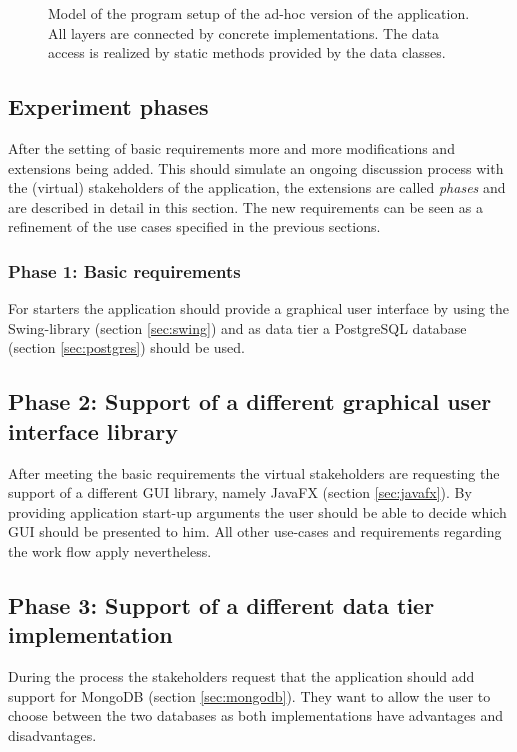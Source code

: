 \begin{figure}
	\label{fig:adhoc-model}
	\caption{Model of the program setup of the ad-hoc version of the application. All layers are connected by concrete implementations. The data access is realized by static methods provided by the data classes.}
\end{figure}

\subsection{Experiment phases}
After the setting of basic requirements more and more modifications and extensions being added. This should simulate an ongoing discussion process with the (virtual) stakeholders of the application, the extensions are called \emph{phases} and are described in detail in this section. The new requirements can be seen as a refinement of the use cases specified in the previous sections.

\subsubsection{Phase 1: Basic requirements} 
For starters the application should provide a graphical user interface by using the Swing-library (section \ref{sec:swing}) and as data tier a PostgreSQL database (section \ref{sec:postgres}) should be used.

\subsection{Phase 2: Support of a different graphical user interface library}
After meeting the basic requirements the virtual stakeholders are requesting the support of a different GUI library, namely JavaFX (section \ref{sec:javafx}). By providing application start-up arguments the user should be able to decide which GUI should be presented to him. All other use-cases and requirements regarding the work flow apply nevertheless.

\subsection{Phase 3: Support of a different data tier implementation}
During the process the stakeholders request that the application should add support for MongoDB (section \ref{sec:mongodb}). They want to allow the user to choose between the two databases as both implementations have advantages and disadvantages. 

